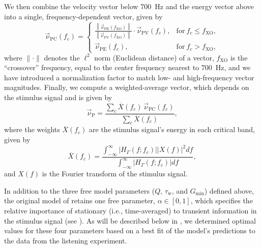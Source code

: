 We then combine the velocity vector below 700~Hz and the energy vector above into a single, frequency-dependent vector, given by
\begin{equation}
\vec{\nu}_{\textrm{PC}}(f_c) =
\begin{cases}
\displaystyle \frac{\left\| \vec{\nu}_{\textrm{PE}}(f_\text{XO}) \right\|}{\left\| \vec{\nu}_{\textrm{PV}}(f_\text{XO}) \right\|} \cdot \vec{\nu}_{\textrm{PV}}(f_c), & \text{for}~f_c \leq f_\text{XO}, \\
\vec{\nu}_{\textrm{PE}}(f_c), & \text{for}~f_c > f_\text{XO},
\end{cases}
\end{equation}
where $\|\cdot\|$ denotes the $\ell^2$ norm (Euclidean distance) of a vector, $f_\text{XO}$ is the ``crossover'' frequency, equal to the center frequency nearest to 700~Hz, and we have introduced a normalization factor to match low- and high-frequency vector magnitudes.
Finally, we compute a weighted-average vector, which depends on the stimulus signal and is given by
\begin{equation}
\vec{\nu}_{\textrm{P}} = \frac{\sum_c \overline{X}(f_c)\, \vec{\nu}_{\textrm{PC}}(f_c)}{\sum_c \overline{X}(f_c)},
\end{equation}
where the weights $\overline{X}(f_c)$ are the stimulus signal's energy in each critical band, given by
\begin{equation}
\overline{X}(f_c) = \frac{\displaystyle \int_{-\infty}^\infty |H_\Gamma(f;f_c)| |X(f)|^2 df}{\displaystyle \int_{-\infty}^\infty |H_\Gamma(f;f_c)| df},
\end{equation}
and $X(f)$ is the Fourier transform of the stimulus signal.

In addition to the three free model parameters ($Q$, $\tau_\text{w}$, and $G_\text{min}$) defined above, the original model of \citet{Stitt2016} retains one free parameter, $\alpha \in [0,1]$, which specifies the relative importance of stationary (i.e., time-averaged) to transient information in the stimulus signal (see ).
As will be described below in , we determined optimal values for these four parameters based on a best fit of the model's predictions to the data from the listening experiment.